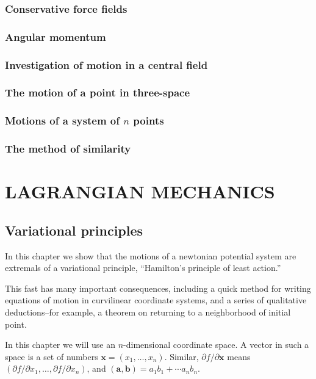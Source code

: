 \documentclass[leqno]{report}
\numberwithin{equation}{section}
\theoremstyle{plain}
\theoremstyle{definition}
\theoremstyle{remark}
\theoremstyle{smallcap}
\numberwithin{prob}{section}
\begin{document}
\section{Conservative force fields}

\section{Angular momentum}

\section{Investigation of motion in a central field}

\section{The motion of a point in three-space}

\section{Motions of a system of $n$ points}

\section{The method of similarity}

\part{LAGRANGIAN MECHANICS}

\chapter{Variational principles}

In this chapter we show that the motions
of a newtonian potential system are extremals
of a variational principle,
``Hamilton's principle of least action.''

This fast has many important consequences,
including a quick method for writing equations
of motion in curvilinear coordinate systems,
and a series of qualitative deductions--for example,
a theorem on returning to a neighborhood of initial point.

In this chapter we will use an $n$-dimensional coordinate space.
%
A vector in such a space is a set of numbers
$\mathbf x = (x_1, \dots, x_n)$.
Similar,
$\partial f/\partial \mathbf x$
means
$(\partial f/\partial x_1, \dots, \partial f/\partial x_n)$,
and
$(\mathbf a, \mathbf b) = a_1 b_1 + \cdots a_n b_n$.
\end{document}
